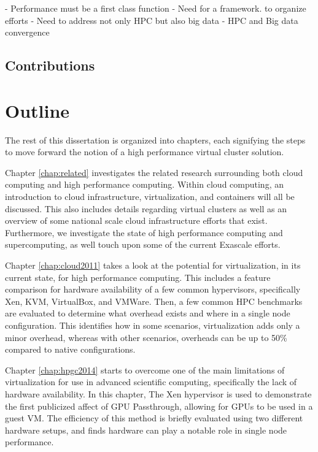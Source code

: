 - Performance must be a first class function
- Need for a framework.  to organize efforts
- Need to address not only HPC but also big data
- HPC and Big data convergence 


\subsection{Contributions}



\section{Outline}
\label{sec:outline}


The rest of this dissertation is organized into chapters, each signifying the steps to move forward the notion of a high performance virtual cluster solution.

Chapter \ref{chap:related} investigates the related research surrounding both cloud computing and high performance computing. Within cloud computing, an introduction to cloud infrastructure, virtualization, and containers will all be discussed. This also includes details regarding virtual clusters as well as an overview of some national scale cloud infrastructure efforts that exist. Furthermore, we investigate the state of high performance computing and supercomputing, as well touch upon some of the current Exascale efforts.

Chapter \ref{chap:cloud2011} takes a look at the potential for virtualization, in its current state, for high performance computing. This includes a feature comparison for hardware availability of a few common hypervisors, specifically Xen, KVM, VirtualBox, and VMWare. Then, a few common HPC benchmarks are evaluated to determine what overhead exists and where in a single node configuration. This identifies how in some scenarios, virtualization adds only a minor overhead, whereas with other scenarios, overheads can be up to 50\% compared to native configurations. 

Chapter \ref{chap:hpgc2014} starts to overcome one of the main limitations of virtualization for use in advanced scientific computing, specifically the lack of hardware availability. In this chapter, The Xen hypervisor is used to demonstrate the first publicized affect of GPU Passthrough, allowing for GPUs to be used in a guest VM. The efficiency of this method is briefly evaluated using two different hardware setups, and finds hardware can play a notable role in single node performance. 

